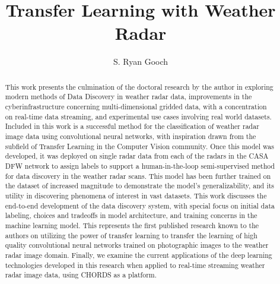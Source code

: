 \documentclass[]{csuthesis} %
\title[Transfer Learning with Weather Radar]{Transfer Learning with Weather Radar}
\author{S. Ryan Gooch}
\begin{document}
\frontmatter

\begin{abstract}
This work presents the culmination of the doctoral research by the author in exploring modern methods of Data Discovery in weather radar data, improvements in the cyberinfrastructure concerning multi-dimensional gridded data, with a concentration on real-time data streaming, and experimental use cases involving real world datasets. 
Included in this work is a successful method for the classification of weather radar image data using convolutional neural networks, with inspiration drawn from the subfield of Transfer Learning in the Computer Vision community. 
Once this model was developed, it was deployed on single radar data from each of the radars in the CASA DFW network to assign labels to support a human-in-the-loop semi-supervised method for data discovery in the weather radar scans. 
This model has been further trained on the dataset of increased magnitude to demonstrate the model’s generalizability, and its utility in discovering phenomena of interest in vast datasets. 
This work discusses the end-to-end development of the data discovery system, with special focus on initial data labeling, choices and tradeoffs in model architecture, and training concerns in the machine learning model. 
This represents the first published research known to the authors on utilizing the power of transfer learning to transfer the learning of high quality convolutional neural networks trained on photographic images to the weather radar image domain.
Finally, we examine the current applications of the deep learning technologies developed in this research when applied to real-time streaming weather radar image data, using CHORDS as a platform.
\end{abstract}

%
\end{document}
